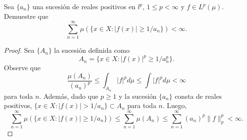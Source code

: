 \documentclass[12pt]{article}
\newenvironment{problem}[2][Problema]{\begin{trivlist}
\item[\hskip \labelsep {\bfseries #1}\hskip \labelsep {\bfseries #2.}]}{\end{trivlist}}
\begin{document}
\begin{problem}{17}
    Sea $\{a_n\}$ una sucesión de reales positivos en $l^p$, $1 \leq p < \infty$ y $f \in L^p(\mu)$. Demuestre que 
$$\sum_{n=1}^\infty \mu \left( \{x \in X: \lvert f(x) \rvert \geq 1 / a_n \} \right) < \infty.$$
\end{problem}
\begin{comment}
    
\begin{proof}
    Sea $\{A_n\}$ la sucesión definida como $A_n = \{ x\in X: \lvert a_n f(x) \rvert^p \geq 1\}.$ Note que $A_n = \{x \in X: \lvert f(x) \rvert \geq 1 / a_n \}$ para toda $n$. Defina la sucesión $\{g_n\}$ de funciones medibles como
    $$g_n =\sum_{i=1}^n \mathbb{1}_{A_i}.$$
    En primer lugar, observe que $g_n \leq \lvert f \rvert^p \sum_{i=1}^n \lvert a_i \rvert^p$ para toda $n$. En segundo lugar, esta es una sucesión creciente de funciones medibles. Entonces,
$$\sum_{n=1}^\infty \mu(A_n) = \lim_{n\to \infty} \int g_n d \mu = \int \lim_{n\to \infty} g_k d \mu \leq \int \lim_{n \to \infty} \lvert f \rvert^p \sum_{i=1}^n \lvert a_i \rvert^p d\mu < \infty,$$
donde la primera desigualdad se debe al Teorema de Convergencia Monótona; la segunda se debe a la monotonicidad de la integral de Lebesgue; y la última desigualdad se debe a que $f\in L^p(\mu)$ y $\{a_n\}$ es una sucesión en $l^p$.
\end{proof}
\end{comment}

\begin{proof} Sea $\{A_n\}$ la sucesión definida como 
$$A_n = \{x \in X: \lvert f(x) \rvert^p \geq 1/a_n^p\}.$$
Observe que 
$$ \frac{\mu(A_n)}{(a_n)^p} \leq \int_{A_n} \lvert f \rvert^p d\mu \leq \int \lvert f \rvert^p d \mu < \infty$$
para toda $n.$ Además, dado que  $p\geq 1$ y la sucesión $\{a_n\}$ consta de reales positivos, $\{x\in X: \lvert f(x) \rvert > 1 / a_n\} \subset A_n$ para toda $n.$ Luego,
$$\sum_{n=1}^\infty \mu \left( \{x \in X: \lvert f(x) \rvert \geq 1 / a_n \} \right) \leq \sum_{n=1}^\infty \mu(A_n) \leq \sum_{n=1}^\infty (a_n)^p \| f \|^p_p < \infty.$$
\end{proof}
\end{document}
